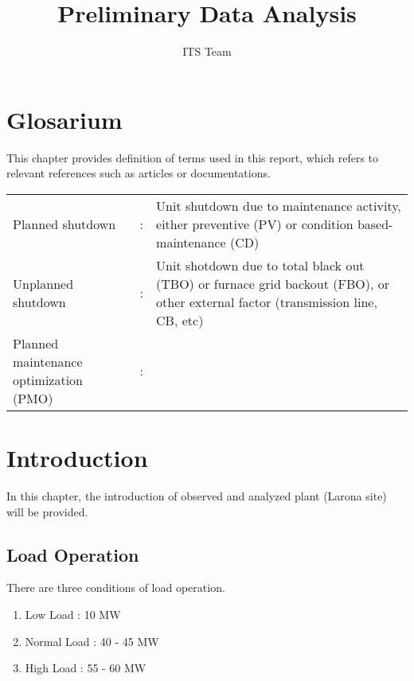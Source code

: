 \documentclass[11pt,a4paper,twoside,onecolumn]{book}
\title{Preliminary Data Analysis}
\author{ITS Team}
\begin{document}
	
	\maketitle
	
	\tableofcontents
	
	\listoffigures
	
	\listoftables
	\newpage

	\chapter*{Glosarium}
	
	This chapter provides definition of terms used in this report, which refers to relevant references such as articles or documentations.
	
		\begin{longtable}{p{} p{} p{}}
			Planned shutdown & : &  Unit shutdown due to maintenance activity, either preventive (PV) or condition based-maintenance (CD)\\
			Unplanned shutdown & : &  Unit shotdown due to total black out (TBO) or furnace grid backout (FBO), or other external factor (transmission line, CB, etc)\\
			Planned maintenance optimization (PMO) & : & \\
			
			
		\end{longtable}
	
	\chapter{Introduction}
	In this chapter, the introduction of observed and analyzed plant (Larona site) will be provided. 
	
	\section{Load Operation}
	There are three conditions of load operation.
		\begin{enumerate}
			\item Low Load : 10 MW
			\item Normal Load : 40 - 45 MW
			\item High Load : 55 - 60 MW
		\end{enumerate}
		
\end{document}
